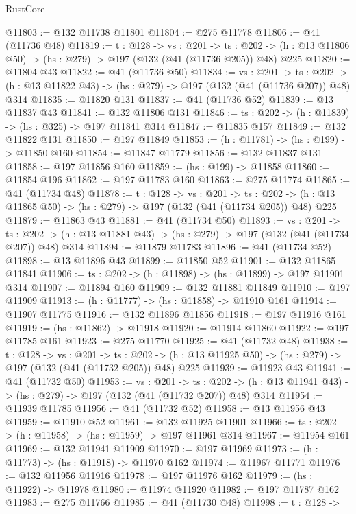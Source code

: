 \begin{lexlean}{RustCore}
\begin{coremodule}
@11803 := @132 @11738 @11801
@11804 := @275 @11778
@11806 := @41 (@11736 @48)
@11819 := {t : @128} ->
  {vs : @201} ->
  {ts : @202} -> (h : @13 @11806 @50) -> (hs : @279) -> @197 (@132 (@41 (@11736 @205)) @48) @225
@11820 := @11804 @43
@11822 := @41 (@11736 @50)
@11834 := {vs : @201} ->
  {ts : @202} -> (h : @13 @11822 @43) -> (hs : @279) -> @197 (@132 (@41 (@11736 @207)) @48) @314
@11835 := @11820 @131
@11837 := @41 (@11736 @52)
@11839 := @13 @11837 @43
@11841 := @132 @11806 @131
@11846 := {ts : @202} -> (h : @11839) -> (hs : @325) -> @197 @11841 @314
@11847 := @11835 @157
@11849 := @132 @11822 @131
@11850 := @197 @11849
@11853 := (h : @11781) -> (hs : @199) -> @11850 @160
@11854 := @11847 @11779
@11856 := @132 @11837 @131
@11858 := @197 @11856 @160
@11859 := (hs : @199) -> @11858
@11860 := @11854 @196
@11862 := @197 @11783 @160
@11863 := @275 @11774
@11865 := @41 (@11734 @48)
@11878 := {t : @128} ->
  {vs : @201} ->
  {ts : @202} -> (h : @13 @11865 @50) -> (hs : @279) -> @197 (@132 (@41 (@11734 @205)) @48) @225
@11879 := @11863 @43
@11881 := @41 (@11734 @50)
@11893 := {vs : @201} ->
  {ts : @202} -> (h : @13 @11881 @43) -> (hs : @279) -> @197 (@132 (@41 (@11734 @207)) @48) @314
@11894 := @11879 @11783
@11896 := @41 (@11734 @52)
@11898 := @13 @11896 @43
@11899 := @11850 @52
@11901 := @132 @11865 @11841
@11906 := {ts : @202} -> (h : @11898) -> (hs : @11899) -> @197 @11901 @314
@11907 := @11894 @160
@11909 := @132 @11881 @11849
@11910 := @197 @11909
@11913 := (h : @11777) -> (hs : @11858) -> @11910 @161
@11914 := @11907 @11775
@11916 := @132 @11896 @11856
@11918 := @197 @11916 @161
@11919 := (hs : @11862) -> @11918
@11920 := @11914 @11860
@11922 := @197 @11785 @161
@11923 := @275 @11770
@11925 := @41 (@11732 @48)
@11938 := {t : @128} ->
  {vs : @201} ->
  {ts : @202} -> (h : @13 @11925 @50) -> (hs : @279) -> @197 (@132 (@41 (@11732 @205)) @48) @225
@11939 := @11923 @43
@11941 := @41 (@11732 @50)
@11953 := {vs : @201} ->
  {ts : @202} -> (h : @13 @11941 @43) -> (hs : @279) -> @197 (@132 (@41 (@11732 @207)) @48) @314
@11954 := @11939 @11785
@11956 := @41 (@11732 @52)
@11958 := @13 @11956 @43
@11959 := @11910 @52
@11961 := @132 @11925 @11901
@11966 := {ts : @202} -> (h : @11958) -> (hs : @11959) -> @197 @11961 @314
@11967 := @11954 @161
@11969 := @132 @11941 @11909
@11970 := @197 @11969
@11973 := (h : @11773) -> (hs : @11918) -> @11970 @162
@11974 := @11967 @11771
@11976 := @132 @11956 @11916
@11978 := @197 @11976 @162
@11979 := (hs : @11922) -> @11978
@11980 := @11974 @11920
@11982 := @197 @11787 @162
@11983 := @275 @11766
@11985 := @41 (@11730 @48)
@11998 := {t : @128} ->

\end{coremodule}
\end{lexlean}
